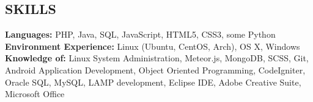 \documentclass[line, margin]{res}
\begin{document}
\begin{resume}
\section{SKILLS}
\textbf{Languages: }PHP, Java, SQL, JavaScript, HTML5, CSS3, some Python\\
\textbf{Environment Experience: } Linux (Ubuntu, CentOS, Arch), OS X, Windows\\
\textbf{Knowledge of: } Linux System Administration, Meteor.js, MongoDB, SCSS,
Git, Android Application Development, Object Oriented Programming, CodeIgniter,
Oracle SQL, MySQL, LAMP development, Eclipse IDE, Adobe Creative Suite,
Microsoft Office\\

\end{resume}
\end{document}
